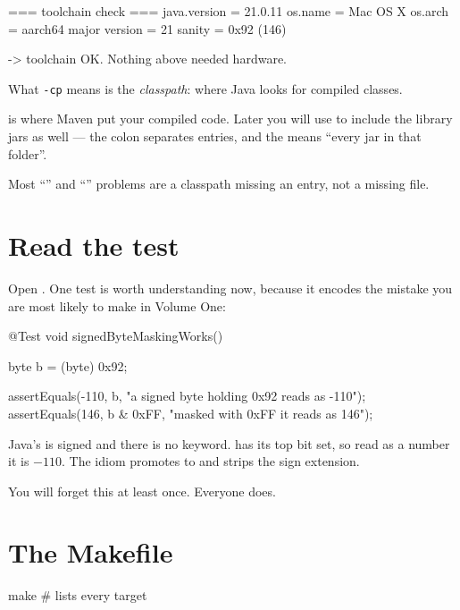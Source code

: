 \begin{trace}
=== toolchain check ===
java.version    = 21.0.11
os.name         = Mac OS X
os.arch         = aarch64
major version   = 21
sanity          = 0x92 (146)

  -> toolchain OK. Nothing above needed hardware.
\end{trace}

\begin{concept}{What \texttt{-cp} means}
 is the \emph{classpath}: where Java looks for compiled classes.

 is where Maven put your compiled code. Later you will use
 to include the library jars as
well --- the colon separates entries, and the \code{*} means ``every jar in that
folder''.

Most ``'' and ``''
problems are a classpath missing an entry, not a missing file.
\end{concept}

\section{Read the test}

Open . One test
is worth understanding now, because it encodes the mistake you are most likely
to make in Volume One:

\begin{jcode}
@Test
void signedByteMaskingWorks() {
    byte b = (byte) 0x92;

    assertEquals(-110, b, "a signed byte holding 0x92 reads as -110");
    assertEquals(146, b & 0xFF, "masked with 0xFF it reads as 146");
}
\end{jcode}

Java's  is signed and there is no  keyword. 
has its top bit set, so read as a number it is $-110$. The idiom 
promotes to  and strips the sign extension.

You will forget this at least once. Everyone does.

\section{The Makefile}

\begin{shell}
make            # lists every target
\end{shell}

